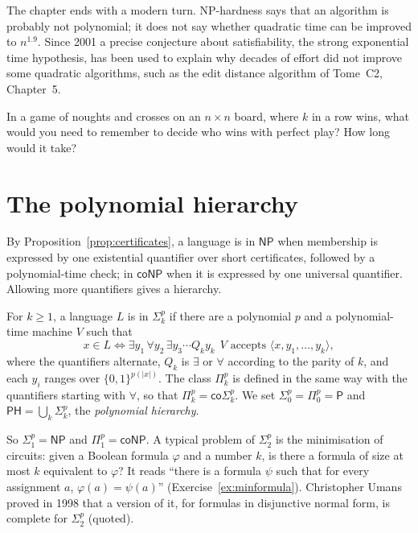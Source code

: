 The chapter ends with a modern turn. NP-hardness says that an algorithm is probably not polynomial; it does not say whether quadratic time can be improved to $n^{1.9}$. Since 2001 a precise conjecture about satisfiability, the strong exponential time hypothesis, has been used to explain why decades of effort did not improve some quadratic algorithms, such as the edit distance algorithm of Tome~C2, Chapter~5.

\begin{think}
In a game of noughts and crosses on an $n\times n$ board, where $k$ in a row wins, what would you need to remember to decide who wins with perfect play? How long would it take?
\end{think}

\section{The polynomial hierarchy}\label{sec:ph}

By Proposition~\ref{prop:certificates}, a language is in $\mathsf{NP}$ when membership is expressed by one existential quantifier over short certificates, followed by a polynomial-time check; in $\mathsf{coNP}$ when it is expressed by one universal quantifier. Allowing more quantifiers gives a hierarchy.

\begin{definition}\label{def:ph}
For $k\ge1$, a language $L$ is in $\Sigma_k^p$ if there are a polynomial $p$ and a polynomial-time machine $V$ such that
\[
x\in L\iff\exists y_1\,\forall y_2\,\exists y_3\cdots Q_ky_k\ \ V\text{ accepts }\langle x,y_1,\dots,y_k\rangle,
\]
where the quantifiers alternate, $Q_k$ is $\exists$ or $\forall$ according to the parity of $k$, and each $y_i$ ranges over $\{0,1\}^{p(|x|)}$. The class $\Pi_k^p$ is defined in the same way with the quantifiers starting with $\forall$, so that $\Pi_k^p=\mathsf{co}\Sigma_k^p$. We set $\Sigma_0^p=\Pi_0^p=\mathsf P$ and $\mathsf{PH}=\bigcup_k\Sigma_k^p$, the \emph{polynomial hierarchy}.
\end{definition}

So $\Sigma_1^p=\mathsf{NP}$ and $\Pi_1^p=\mathsf{coNP}$. A typical problem of $\Sigma_2^p$ is the minimisation of circuits: given a Boolean formula $\varphi$ and a number $k$, is there a formula of size at most $k$ equivalent to $\varphi$? It reads ``there is a formula $\psi$ such that for every assignment $a$, $\varphi(a)=\psi(a)$'' (Exercise~\ref{ex:minformula}). Christopher Umans proved in 1998 that a version of it, for formulas in disjunctive normal form, is complete for $\Sigma_2^p$ (quoted).

